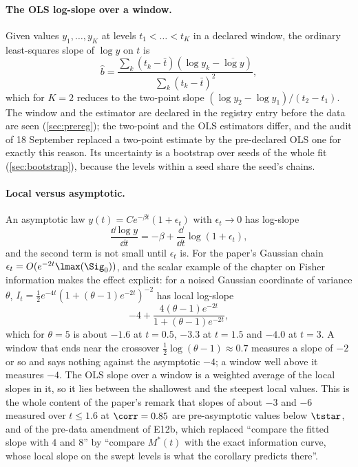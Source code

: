 \paragraph{The OLS log-slope over a window.}
Given values $y_1,\dots,y_K$ at levels $t_1<\dots<t_K$ in a declared window, the
ordinary least-squares slope of $\log y$ on $t$ is
\begin{equation}
  \hat b=\frac{\sum_k(t_k-\bar t)(\log y_k-\overline{\log y})}{\sum_k(t_k-\bar t)^2},
  \label{eq:ols-slope}
\end{equation}
which for $K=2$ reduces to the two-point slope $(\log y_2-\log y_1)/(t_2-t_1)$. The
window and the estimator are declared in the registry entry before the data are seen
(\cref{sec:prereg}); the two-point and the OLS estimators differ, and the audit of 18
September replaced a two-point estimate by the pre-declared OLS one for exactly this
reason. Its uncertainty is a bootstrap over seeds of the whole fit
(\cref{sec:bootstrap}), because the levels within a seed share the seed's chains.

\paragraph{Local versus asymptotic.}
An asymptotic law $y(t)=Ce^{-\beta t}(1+\epsilon_t)$ with $\epsilon_t\to0$ has log-slope
\begin{equation}
  \frac{\dd\log y}{\dd t}=-\beta+\frac{\dd}{\dd t}\log(1+\epsilon_t),
\end{equation}
and the second term is not small until $\epsilon_t$ is. For the paper's Gaussian chain
$\epsilon_t=O(e^{-2t}\lmax(\Sig_0))$, and the scalar example of the chapter on Fisher
information makes the effect explicit: for a noised Gaussian coordinate of variance
$\theta$, $I_t=\tfrac12e^{-4t}(1+(\theta-1)e^{-2t})^{-2}$ has local log-slope
\begin{equation}
  -4+\frac{4(\theta-1)e^{-2t}}{1+(\theta-1)e^{-2t}},
\end{equation}
which for $\theta=5$ is about $-1.6$ at $t=0.5$, $-3.3$ at $t=1.5$ and $-4.0$ at $t=3$.
A window that ends near the crossover $\tfrac12\log(\theta-1)\approx0.7$ measures a
slope of $-2$ or so and says nothing against the asymptotic $-4$; a window well above it
measures $-4$. The OLS slope over a window is a weighted average of the local slopes
in it, so it lies between the shallowest and the steepest local values. This is the
whole content of the paper's remark that slopes of about $-3$ and $-6$ measured over
$t\le1.6$ at $\corr=0.85$ are pre-asymptotic values below $\tstar$, and of the
pre-data amendment of E12b, which replaced ``compare the fitted slope with $4$ and
$8$'' by ``compare $M^*(t)$ with the exact information curve, whose local slope on the
swept levels is what the corollary predicts there''.

